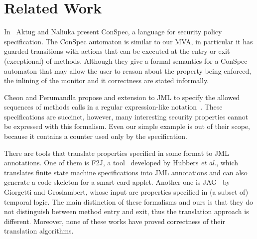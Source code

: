 \section{Related Work}\label{SecRelated}

In~\cite{Aktug07} Aktug and Naliuka present ConSpec, a language for security
policy specification.
The ConSpec automaton is similar to our MVA, in particular it
has guarded transitions with actions that can be executed at the entry or exit
(exceptional) of methods. Although they give a formal semantics for a ConSpec
automaton that may allow the user to reason about the property being enforced,
the inlining of the monitor and it correctness are stated informally.

Cheon and Perumandla propose and extension to JML to specify the allowed
sequences of methods calls in a regular expression-like notation~\cite{Cheon07}.
These specifications are succinct, however, many interesting
security properties cannot be expressed with this formalism. Even our simple
example is out of their scope, because it contains a counter used
only by the specification.

There are tools that translate properties specified in some format to JML
annotations.
One of them is F2J, a tool~\cite{Hubbers03} developed by Hubbers \emph{et al.},
which translates finite state machine specifications into JML annotations and
can also generate a code skeleton for a smart card applet.
Another one is JAG~\cite{Giorgetti06} by Giorgetti and Groslambert, whose input
are properties specified in (a subset of) temporal logic.
The main distinction of these formalisms and ours is that they do not distinguish
between method entry and exit, thus the translation approach is different.
Moreover, none of these works have proved correctness of their translation
algorithms.

